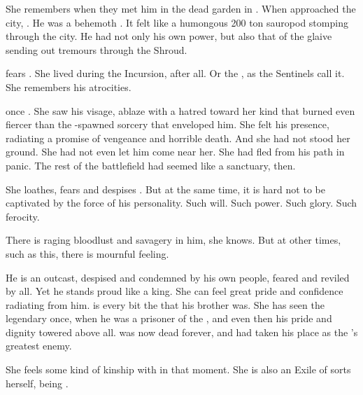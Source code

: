 She remembers \Ishnaruchaefir when they met him in the dead garden in \Malcur. 
When \Ishnaruchaefir{} approached the city, \Achsah{} . 
He was a behemoth \vertex. 
It felt like a humongous 200 ton sauropod stomping through the city. 
He had not only his own \vertex{} power, but also that of the glaive sending out tremours through the Shroud. 

\Achsah fears \Ishnaruchaefir.
She lived during the Incursion, after all. 
Or the \secondbanewar, as the Sentinels call it. 
She remembers his atrocities. 

\Achsah once . 
She saw his visage, ablaze with a hatred toward her kind that burned even fiercer than the \xs-spawned sorcery that enveloped him. 
She felt his presence, radiating a promise of vengeance and horrible death. 
And she had not stood her ground. 
She had not even let him come near her. 
She had fled from his path in panic. 
The rest of the battlefield had seemed like a sanctuary, then. 

\begin{prose}
\end{prose}



She loathes, fears and despises \Ishnaruchaefir. 
But at the same time, it is hard not to be captivated by the force of his personality. 
Such will. 
Such power. 
Such glory. 
Such ferocity. 

There is raging bloodlust and savagery in him, she knows. 
But at other times, such as this, there is mournful feeling. 

He is an outcast, despised and condemned by his own people, feared and reviled by all. 
Yet he stands proud like a king. 
She can feel great pride and confidence radiating from him.
\Ishnaruchaefir is every bit the \dragonking{} that his brother \Nexagglachel{} was. 
She has seen the legendary \Nexagglachel once, when he was a prisoner of the \resphain, and even then his pride and dignity towered above all. 
\Nexagglachel was now dead forever, and \Ishnaruchaefir had taken his place as the \resphain's greatest enemy. 

She feels some kind of kinship with \Ishnaruchaefir in that moment. 
She is also an Exile of sorts herself, being \ashenblooded. 

